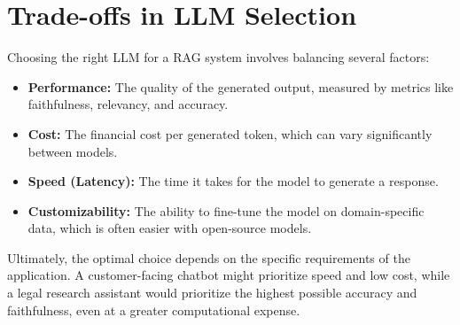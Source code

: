 \section{Trade-offs in LLM Selection}
Choosing the right LLM for a RAG system involves balancing several factors:
\begin{itemize}
    \item \textbf{Performance:} The quality of the generated output, measured by metrics like faithfulness, relevancy, and accuracy.
    \item \textbf{Cost:} The financial cost per generated token, which can vary significantly between models.
    \item \textbf{Speed (Latency):} The time it takes for the model to generate a response.
    \item \textbf{Customizability:} The ability to fine-tune the model on domain-specific data, which is often easier with open-source models.
\end{itemize}

Ultimately, the optimal choice depends on the specific requirements of the application. A customer-facing chatbot might prioritize speed and low cost, while a legal research assistant would prioritize the highest possible accuracy and faithfulness, even at a greater computational expense.
